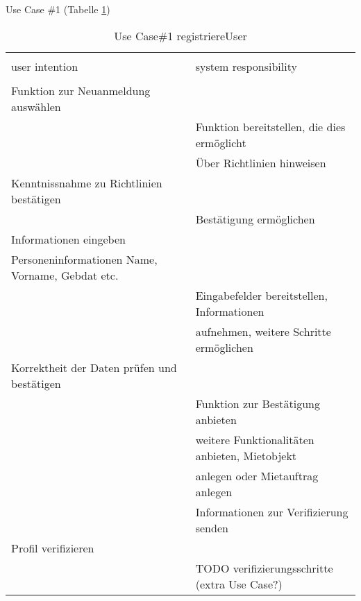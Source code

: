 Use Case \#1 (Tabelle \ref{tab:anmeldenUC})
\begin{table}[H]
\caption{Use Case\#1 registriereUser }
\centering
\begin{tabular}{l l}
\\ [-0.5ex]

\hline\hline
\\ [-0.5ex]
user intention & system responsibility
\\ [1.5ex]
\hline
\\ [-0.5ex]
Funktion zur Neuanmeldung auswählen             &                                   \\[1ex]
                                       & Funktion bereitstellen, die dies ermöglicht   \\[1ex]
                                       & Über Richtlinien hinweisen              \\[1ex]
Kenntnissnahme zu Richtlinien bestätigen        &                                   \\[1ex]
                                       & Bestätigung ermöglichen                 \\[1ex]
Informationen eingeben                       &                                   \\[1ex] 
Personeninformationen Name, Vorname, Gebdat etc.   &                                   \\[1ex] 
                                       & Eingabefelder bereitstellen, Informationen    \\[1ex]
                                       & aufnehmen, weitere Schritte ermöglichen    \\[1ex]
Korrektheit der Daten prüfen und bestätigen        &                                   \\[1ex]
                                       & Funktion zur Bestätigung anbieten          \\[1ex]
                                       & weitere Funktionalitäten anbieten, Mietobjekt \\[1ex]
                                       & anlegen oder Mietauftrag anlegen           \\[1ex]
                                       & Informationen zur Verifizierung senden     \\[1ex]
Profil verifizieren                          &                                   \\[1ex]
                                       & TODO verifizierungsschritte (extra Use Case?) \\[1ex]


\hline
\end{tabular}
\label{tab:anmeldenUC}
\end{table}


